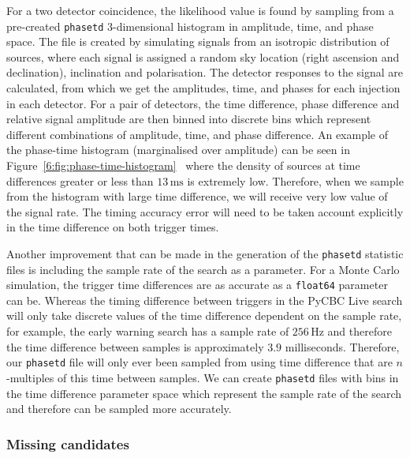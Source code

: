 For a two detector coincidence, the likelihood value is found by sampling from a pre-created \texttt{phasetd} 3-dimensional histogram in amplitude, time, and phase space. The file is created by simulating \gwadj signals from an isotropic distribution of sources, where each signal is assigned a random sky location (right ascension and declination), inclination and polarisation. The detector responses to the signal are calculated, from which we get the amplitudes, time, and phases for each injection in each detector. For a pair of detectors, the time difference, phase difference and relative signal amplitude are then binned into discrete bins which represent different combinations of amplitude, time, and phase difference. An example of the phase-time histogram (marginalised over amplitude) can be seen in Figure~\ref{6:fig:phase-time-histogram}~\cite{PyCBC:2017} where the density of sources at time differences greater or less than $13 \, \text{ms}$ is extremely low. Therefore, when we sample from the histogram with large time difference, we will receive very low value of the signal rate. The timing accuracy error will need to be taken account explicitly in the time difference on both trigger times.

Another improvement that can be made in the generation of the \texttt{phasetd} statistic files is including the sample rate of the search as a parameter. For a Monte Carlo simulation, the trigger time differences are as accurate as a \texttt{float64} parameter can be. Whereas the timing difference between triggers in the PyCBC Live search will only take discrete values of the time difference dependent on the sample rate, for example, the early warning search has a sample rate of $256 \, \text{Hz}$ and therefore the time difference between samples is approximately $3.9$ milliseconds. Therefore, our \texttt{phasetd} file will only ever been sampled from using time difference that are $n$-multiples of this time between samples. We can create \texttt{phasetd} files with bins in the time difference parameter space which represent the sample rate of the search and therefore can be sampled more accurately.

\subsubsection{\label{6:sec:missing-cands}Missing candidates}

